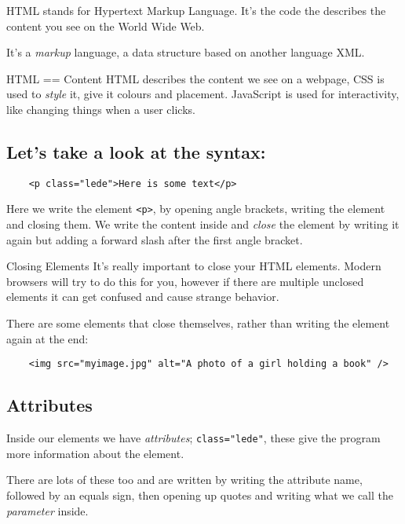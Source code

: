 HTML stands for Hypertext Markup Language. It's the code the describes the content you see on the World Wide Web.

It's a \textit{markup} language, a data structure based on another language XML.

\begin{infobox}{HTML == Content}
    HTML describes the content we see on a webpage, CSS is used to \textit{style} it, give it colours and placement. JavaScript is used for interactivity, like changing things when a user clicks.
\end{infobox}

\subsection{Let's take a look at the syntax:}

\begin{verbatim}
    <p class="lede">Here is some text</p>
\end{verbatim}

Here we write the element \texttt{<p>}, by opening angle brackets, writing the element and closing them. We write the content inside and \textit{close} the element by writing it again but adding a forward slash after the first angle bracket.

\begin{infobox}{Closing Elements}
    It's really important to close your HTML elements. Modern browsers will try to do this for you, however if there are multiple unclosed elements it can get confused and cause strange behavior.
\end{infobox}

There are some elements that close themselves, rather than writing the element again at the end:

\begin{verbatim}
    <img src="myimage.jpg" alt="A photo of a girl holding a book" />
\end{verbatim}

\subsection{Attributes}

Inside our elements we have \textit{attributes}; \texttt{class="lede"}, these give the program more information about the element.

There are lots of these too and are written by writing the attribute name, followed by an equals sign, then opening up quotes and writing what we call the \textit{parameter} inside.

